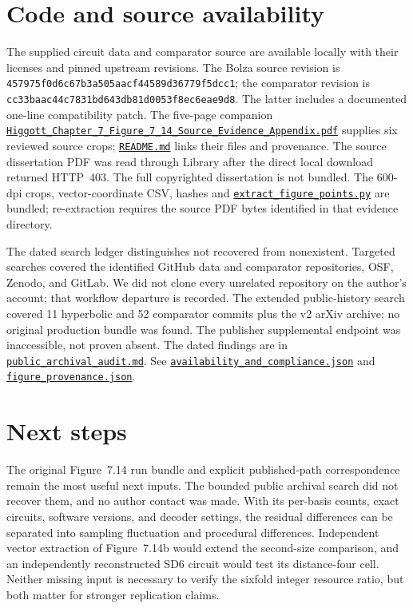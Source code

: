 \documentclass[11pt]{article}
\newcommand{\file}[2]{\href{https://github.com/alectionary/vibe-math/blob/master/formalization/higgott-quantum-decoding/#1}{\nolinkurl{#2}}}
\begin{document}
\section{Code and source availability}
The supplied circuit data and comparator source are available locally with their licenses and pinned upstream revisions. The Bolza source revision is \nolinkurl{457975f0d6c67b3a505aacf44589d36779f5dcc1}; the comparator revision is \nolinkurl{cc33baac44c7831bd643db81d0053f8ec6eae9d8}. The latter includes a documented one-line compatibility patch. The five-page companion \file{source-evidence/Higgott_Chapter_7_Figure_7_14_Source_Evidence_Appendix.pdf}{Higgott_Chapter_7_Figure_7_14_Source_Evidence_Appendix.pdf} supplies six reviewed source crops; \file{source-evidence/README.md}{README.md} links their files and provenance. The source dissertation PDF was read through Library after the direct local download returned HTTP~403. The full copyrighted dissertation is not bundled. The 600-dpi crops, vector-coordinate CSV, hashes and \file{source-evidence/extract_figure_points.py}{extract_figure_points.py} are bundled; re-extraction requires the source PDF bytes identified in that evidence directory.

The dated search ledger distinguishes not recovered from nonexistent. Targeted searches covered the identified GitHub data and comparator repositories, OSF, Zenodo, and GitLab. We did not clone every unrelated repository on the author's account; that workflow departure is recorded. The extended public-history search covered 11 hyperbolic and 52 comparator commits plus the v2 arXiv archive; no original production bundle was found. The publisher supplemental endpoint was inaccessible, not proven absent. The dated findings are in \file{revision2/public_archival_audit.md}{public_archival_audit.md}. See \file{provenance/availability_and_compliance.json}{availability_and_compliance.json} and \file{source/figure_provenance.json}{figure_provenance.json}.

\section{Next steps}
The original Figure~7.14 run bundle and explicit published-path correspondence remain the most useful next inputs. The bounded public archival search did not recover them, and no author contact was made. With its per-basis counts, exact circuits, software versions, and decoder settings, the residual differences can be separated into sampling fluctuation and procedural differences. Independent vector extraction of Figure~7.14b would extend the second-size comparison, and an independently reconstructed SD6 circuit would test its distance-four cell. Neither missing input is necessary to verify the sixfold integer resource ratio, but both matter for stronger replication claims.
\end{document}
